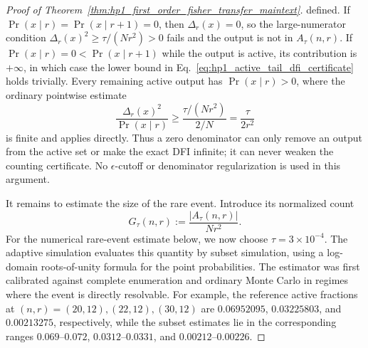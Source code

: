 \begin{proof}[Proof of Theorem~\ref{thm:hp1_first_order_fisher_transfer_maintext}]
defined.  If \(\Pr(x\mid r)=\Pr(x\mid r+1)=0\), then
\(\Delta_r(x)=0\), so the large-numerator condition
\(\Delta_r(x)^2\ge\tau/(Nr^2)>0\) fails and the output is not in
\(A_\tau(n,r)\).  If \(\Pr(x\mid r)=0<\Pr(x\mid r+1)\) while the output is
active, its contribution is \(+\infty\), in which case the lower bound in
Eq.~\eqref{eq:hp1_active_tail_dfi_certificate} holds trivially.  Every
remaining active output has \(\Pr(x\mid r)>0\), where the ordinary pointwise estimate
\begin{equation}
    \frac{\Delta_r(x)^2}{\Pr(x\mid r)}
    \ge
    \frac{\tau/(Nr^2)}{2/N}
    =
    \frac{\tau}{2r^2}
    \label{eq:hp1_active_tail_finite_point_bound}
\end{equation}
is finite and applies directly.  Thus a zero denominator can only remove an
output from the active set or make the exact DFI infinite; it can never weaken
the counting certificate.  No \(\epsilon\)-cutoff or denominator
regularization is used in this argument.

It remains to estimate the size of the rare event.  Introduce its normalized
count
\begin{equation}
    G_\tau(n,r)
    :=
    \frac{\lvert A_\tau(n,r)\rvert}{Nr^2}.
    \label{eq:hp1_active_tail_normalized_count}
\end{equation}
For the numerical rare-event estimate below, we now choose
\(\tau=3\times10^{-4}\).  The adaptive simulation evaluates this quantity by
subset simulation, using a log-domain roots-of-unity formula for the point
probabilities.  The
estimator was first calibrated against complete enumeration and ordinary
Monte Carlo in regimes where the event is directly resolvable.  For example,
the reference active fractions at \((n,r)=(20,12),(22,12),(30,12)\) are
\(0.06952095\), \(0.03225803\), and \(0.00213275\), respectively, while the
subset estimates lie in the corresponding ranges \(0.069\)--\(0.072\),
\(0.0312\)--\(0.0331\), and \(0.00212\)--\(0.00226\).


\end{proof}
